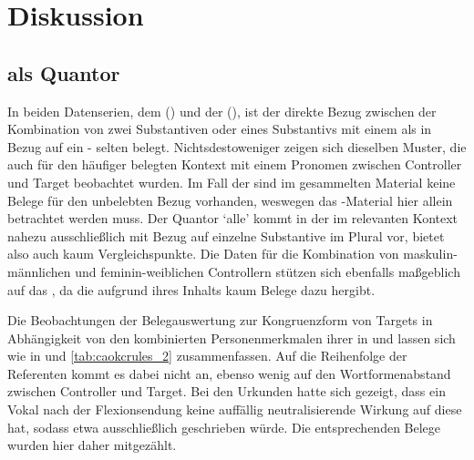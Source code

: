 \chapter{Diskussion}
\label{ch:diskussion}

\section{ als Quantor}
\label{sec:beidequant}

In beiden Datenserien, dem 
(\CAO{}) und der  (\KC{}), ist der direkte Bezug zwischen
der Kombination von zwei Substantiven oder eines Substantivs mit
einem  als  in Bezug auf ein
- selten belegt. Nichtsdestoweniger zeigen sich
dieselben Muster, die auch für den häufiger belegten Kontext mit einem Pronomen
zwischen Controller und Target beobachtet wurden. Im Fall der \KC{} sind im
gesammelten Material keine Belege für den unbelebten Bezug
vorhanden, weswegen das \CAO{}-Material hier allein betrachtet werden muss. Der
Quantor  `alle' \autocite[vgl.][606--621]{ksw2} kommt in der \KC{} im
relevanten Kontext nahezu ausschließlich mit Bezug auf einzelne Substan\-tive
im Plural vor, bietet also auch kaum Vergleichspunkte. Die Daten für die
Kombination von maskulin-männlichen und feminin-weiblichen Controllern stützen
sich ebenfalls maßgeblich auf das \CAO{}, da die \KC{} aufgrund ihres Inhalts
kaum Belege dazu hergibt.

Die Beobachtungen der Belegauswertung zur Kongruenzform von Targets
in Abhängigkeit von den kombinierten Personenmerkmalen
ihrer  in  und
 lassen sich wie in  und
\ref{tab:caokcrules_2} zusammenfassen. Auf die Reihenfolge der
Referenten kommt es dabei nicht an, ebenso wenig auf den
Wortformenabstand zwischen Controller und Target. Bei den
Urkunden hatte sich gezeigt, dass ein Vokal nach der Flexionsendung
 keine auffällig neutrali\-sie\-rende Wirkung auf diese hat,
sodass etwa ausschließlich  geschrieben würde. Die entsprechenden
Belege wurden hier daher mitgezählt.


